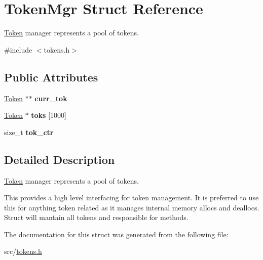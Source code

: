 \hypertarget{struct_token_mgr}{}\section{Token\+Mgr Struct Reference}
\label{struct_token_mgr}


\mbox{\hyperlink{struct_token}{Token}} manager represents a pool of tokens.  




{\ttfamily \#include $<$tokens.\+h$>$}

\subsection*{Public Attributes}
\begin{DoxyCompactItemize}
\item 
\mbox{\label{struct_token_mgr_a7f5a58a2f7ba83078262f1c5509c7dca}} 
\mbox{\hyperlink{struct_token}{Token}} $\ast$$\ast$ {\bfseries curr\+\_\+tok}
\item 
\mbox{\label{struct_token_mgr_a0863848afa7874307f5ed4d46c1a22e5}} 
\mbox{\hyperlink{struct_token}{Token}} $\ast$ {\bfseries toks} \mbox{[}1000\mbox{]}
\item 
\mbox{\label{struct_token_mgr_a764c0f04ff55f5e23b727b1c7de8003e}} 
size\+\_\+t {\bfseries tok\+\_\+ctr}
\end{DoxyCompactItemize}


\subsection{Detailed Description}
\mbox{\hyperlink{struct_token}{Token}} manager represents a pool of tokens. 

This provides a high level interfacing for token management. It is preferred to use this for anything token related as it manages internal memory allocs and deallocs. Struct will mantain all tokens and responsible for methods. 

The documentation for this struct was generated from the following file\+:\begin{DoxyCompactItemize}
\item 
src/\mbox{\hyperlink{tokens_8h}{tokens.\+h}}\end{DoxyCompactItemize}
